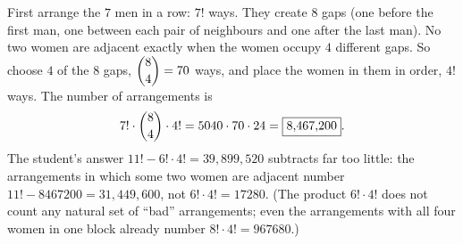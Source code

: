 First arrange the $7$ men in a row: $7!$ ways. They create $8$ gaps (one before the first man, one between each pair of neighbours and one after the last man). No two women are adjacent exactly when the women occupy $4$ different gaps. So choose $4$ of the $8$ gaps, $\dbinom84=70$ ways, and place the women in them in order, $4!$ ways. The number of arrangements is
\[7!\cdot\dbinom84\cdot4!=5040\cdot70\cdot24=\boxed{8{,}467{,}200}.\]
The student's answer $11!-6!\cdot4!=39{,}899{,}520$ subtracts far too little: the arrangements in which some two women are adjacent number $11!-8467200=31{,}449{,}600$, not $6!\cdot4!=17280$. (The product $6!\cdot4!$ does not count any natural set of ``bad'' arrangements; even the arrangements with all four women in one block already number $8!\cdot4!=967680$.)
